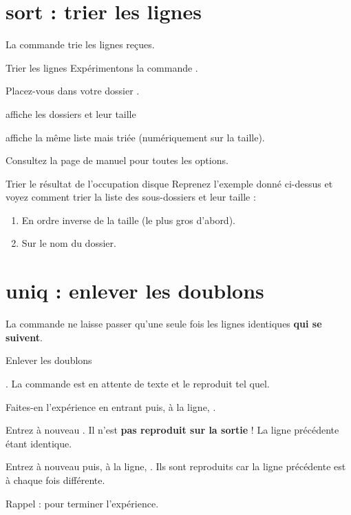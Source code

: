 \documentclass[a4paper,11pt]{style-esi/td}
\begin{document}
	\section{sort : trier les lignes}

		La commande  trie les lignes reçues.

		\begin{Experience}{Trier les lignes}
			Expérimentons la commande .
			\begin{steps}
			\item 
				Placez-vous dans votre dossier .
			\item 
				affiche les dossiers et leur taille
			\item 
				affiche la même liste mais triée (numériquement sur la taille).
			\end{steps}
			Consultez la page de manuel pour toutes les options.
		\end{Experience}

		\begin{Exercice}{Trier le résultat de l'occupation disque}
			Reprenez l'exemple donné ci-dessus et voyez comment trier
			la liste des sous-dossiers et leur taille :
			\begin{enumerate}
			\item En ordre inverse de la taille (le plus gros d'abord).
			\item Sur le nom du dossier.
			\end{enumerate}
		\end{Exercice}

	\section{uniq : enlever les doublons}

		La commande  ne laisse passer qu'une seule fois
		les lignes identiques \textbf{qui se suivent}.

		\begin{Experience}{Enlever les doublons}
			\begin{steps}
			\item 
				\kbd{cat | uniq}.
				La commande est en attente de texte et le reproduit tel quel.
			\item 
				Faites-en l'expérience en entrant  puis, à la ligne,
				\kbd{hello}.
			\item 
				Entrez à nouveau \kbd{hello}.
				Il n'est \textbf{pas reproduit sur la sortie} !
				La ligne précédente étant identique.
			\item 
				Entrez à nouveau   puis, à la ligne, \kbd{hello}.
				Ils sont reproduits car la ligne précédente est à chaque fois
				différente.
			\item 
				Rappel :  pour terminer l'expérience.
			\end{steps}
		\end{Experience}
\end{document}
